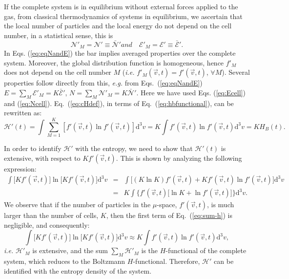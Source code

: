 If the complete system is in equilibrium without external forces applied to
the gas, from classical thermodynamics of
systems in equilibrium, we ascertain that the local number
of particles and the local
energy do not depend on the cell number, in a statistical sense, this is
%
\begin{subequations}\label{eq:eqNandE}
\begin{equation}
   \mathcal{N}'_M=\mathcal{N}'\equiv \bar{\mathcal{N}}'
\end{equation}
%
and
%
\begin{equation}
   \quad\mathcal{E}'_M=\mathcal{E}'\equiv\bar{\mathcal{E}}'.
\end{equation}
\end{subequations}
%
In Eqs. (\ref{eq:eqNandE}) the bar implies averaged properties over the complete system.
Moreover, the global distribution function is homogeneous, hence $f'_M$
does not depend on the cell number $M$ (\textit{i.e.} $f'_M(\vec v,t)=f'(\vec v,t)$,
$\forall M$). Several properties follow directly from this, \textit{e.g.}
from Eqs.~(\ref{eq:eqNandE}) $E=\sum_M\mathcal{E}'_M=K\bar{\mathcal{E}}'$, $N=\sum_M\mathcal{N}'_M=K\bar{\mathcal{N}}'$. Here we have used Eqs. (\ref{eq:Ecell}) and (\ref{eq:Ncell}).
Eq.~(\ref{eq:cHdef}), in terms of Eq.~(\ref{eq:hbfunctional}), can be rewritten as:
%
\begin{equation}
    \mathcal{H}'(t)=\int \sum_{M=1}^{K} [f'(\vec{v},t)\ln f'(\vec{v},t)] \mathrm{d}^{3}v
         = K\int  f'(\vec{v},t) \ln f'(\vec{v},t) \mathrm{d}^{3}v= K H_{B}(t).
\end{equation}
%

In order to identify $\mathcal{H}'$ with the entropy, we need to show that $\mathcal{H}'(t)$ is extensive,
with respect to $Kf'(\vec v,t)$.
This is shown by analyzing the following expression:
%
\begin{eqnarray}\label{eq:sum-h}
    \int \big[Kf'(\vec{v},t)\big] \ln \big[Kf'(\vec{v},t)\big] \mathrm{d}^{3}v & = & 
        \int \big[(K\ln K)f'(\vec{v},t) + Kf'(\vec{v},t) \ln f'(\vec{v},t)\big]\mathrm{d}^{3}v\nonumber\\
        & = & K\int\Big\{ f'(\vec{v},t)\big[\ln K + \ln f'(\vec{v},t)\big] \Big\}\mathrm{d}^{3}v.
\end{eqnarray}
%
We observe that if the number of particles in the $\mu$-space, $f'(\vec{v},t)$, is much larger than
the number of cells, $K$, then the first term of Eq.~(\ref{eq:sum-h}) is negligible, and consequently:
%
\begin{equation}\label{aditive-property}
    \int \big[Kf'(\vec{v},t)\big] \ln \big[Kf'(\vec{v},t)\big] \mathrm{d}^{3}v \approx
    K\int f'(\vec{v},t) \ln f'(\vec{v},t) \mathrm{d}^{3}v,
\end{equation}
%
\textit{i.e.} $\mathcal{H}'_M$ is extensive, and the sum $\sum_M\mathcal{H}'_M$ is the $H$-functional of the complete
system, which reduces to the Boltzmann $H$-functional.
Therefore, $\mathcal{H}'$ can be identified with the entropy density of the system.

